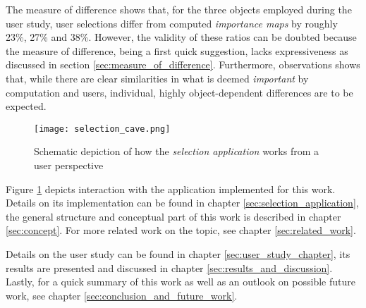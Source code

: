 The measure of difference shows that, for the three objects employed during the user study, user selections differ from computed \textit{importance maps} by roughly 23\%, 27\% and 38\%. However, the validity of these ratios can be doubted because the measure of difference, being a first quick suggestion, lacks expressiveness as discussed in section \ref{sec:measure_of_difference}. Furthermore, observations shows that, while there are clear similarities in what is deemed \textit{important} by computation and users, individual, highly object-dependent differences are to be expected.

\begin{figure}[htb]
  \centering
  \texttt{[image: selection\_cave.png]}
  \caption{Schematic depiction of how the \textit{selection application} works from a user perspective}
  \label{fig:intro_pic}
\end{figure}

Figure \ref{fig:intro_pic} depicts interaction with the application implemented for this work. Details on its implementation can be found in chapter \ref{sec:selection_application}, the general structure and conceptual part of this work is described in chapter \ref{sec:concept}. For more related work on the topic, see chapter \ref{sec:related_work}.

Details on the user study can be found in chapter \ref{sec:user_study_chapter}, its results are presented and discussed in chapter \ref{sec:results_and_discussion}. Lastly, for a quick summary of this work as well as an outlook on possible future work, see chapter \ref{sec:conclusion_and_future_work}.

